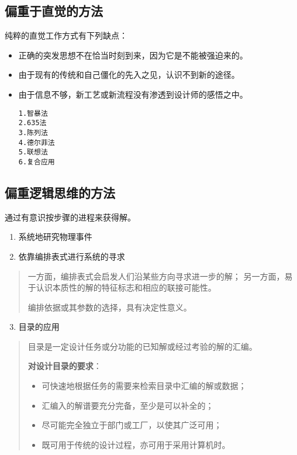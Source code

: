 \documentclass[letterpaper,10pt,english]{sphinxmanual}
\begin{document}
\subsection{偏重于直觉的方法}
\label{unit5:id15}
纯粹的直觉工作方式有下列缺点：
\begin{itemize}
\item {} 
正确的突发思想不在恰当时刻到来，因为它是不能被强迫来的。

\item {} 
由于现有的传统和自己僵化的先入之见，认识不到新的途径。

\item {} 
由于信息不够，新工艺或新流程没有渗透到设计师的感悟之中。

\begin{Verbatim}[commandchars=\\\{\}]
1.智暴法
2.635法
3.陈列法
4.德尔菲法
5.联想法
6.复合应用
\end{Verbatim}

\end{itemize}


\subsection{偏重逻辑思维的方法}
\label{unit5:id16}
通过有意识按步骤的进程来获得解。
\begin{enumerate}
\item {} 
系统地研究物理事件

\item {} 
依靠编排表式进行系统的寻求

\end{enumerate}
\begin{quote}

一方面，编排表式会启发人们沿某些方向寻求进一步的解；
另一方面，易于认识本质性的解的特征标志和相应的联接可能性。

编排依据或其参数的选择，具有决定性意义。
\end{quote}
\begin{enumerate}
\setcounter{enumi}{2}
\item {} 
目录的应用

\end{enumerate}
\begin{quote}

目录是一定设计任务或分功能的已知解或经过考验的解的汇编。

\textbf{对设计目录的要求}：
\begin{itemize}
\item {} 
可快速地根据任务的需要来检索目录中汇编的解或数据；

\item {} 
汇编入的解谱要充分完备，至少是可以补全的；

\item {} 
尽可能完全独立于部门或工厂，以使其广泛可用；

\item {} 
既可用于传统的设计过程，亦可用于采用计算机时。

\end{itemize}
\end{quote}
\end{document}
